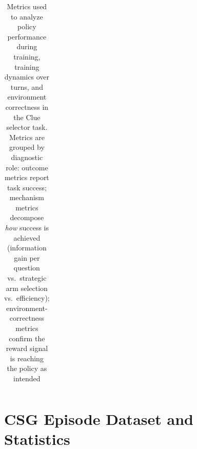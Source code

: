 \documentclass[11pt]{article}
\theoremstyle{plain}
\theoremstyle{definition}
\theoremstyle{remark}
\begin{document}
\begin{table}[t]
\begin{tabularx}{\linewidth}{p{3.0cm}p{4.6cm}X}
\midrule
\bottomrule
\end{tabularx}
\caption{Metrics used to analyze policy performance during training, training dynamics over turns, and environment correctness in the Clue selector task. Metrics are grouped by diagnostic role: outcome metrics report task success; mechanism metrics decompose \emph{how} success is achieved (information gain per question vs.\ strategic arm selection vs.\ efficiency); environment-correctness metrics confirm the reward signal is reaching the policy as intended}

\label{tab:metric_definitions}
\end{table}


\section{CSG Episode Dataset and Statistics}


\end{document}
